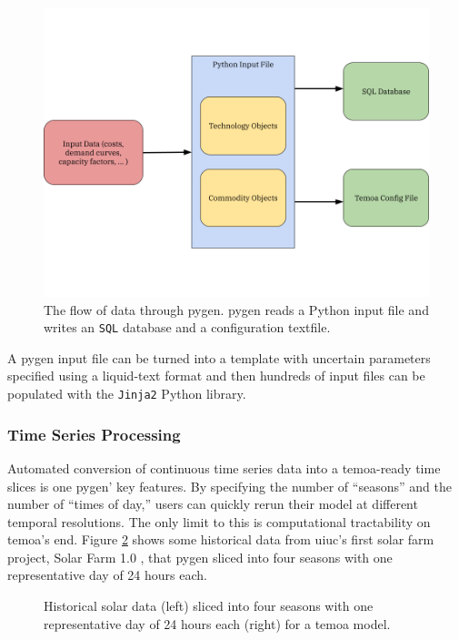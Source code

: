 \begin{figure}[H]
  \centering
  \includegraphics[width=0.8\columnwidth]{figures/pygen-outline.png}
  \caption{The flow of data through \gls{pygen}. \gls{pygen} reads a Python
  input file and writes an \texttt{SQL} database and a configuration textfile.}
  \label{fig:pygen-flow}
\end{figure}
A \gls{pygen} input file can be turned into a template with uncertain parameters
specified using a liquid-text format and then hundreds of input files can be
populated with the \texttt{Jinja2} Python library.

\subsubsection{Time Series Processing}
Automated conversion of continuous time series data into a \gls{temoa}-ready
time slices is one \gls{pygen}' key features. By specifying the number of ``seasons''
and the number of ``times of day,'' users can quickly rerun their model at different
temporal resolutions. The only limit to this is computational tractability on \gls{temoa}'s
end. Figure \ref{fig:solar-timeslice} shows some historical data from \gls{uiuc}'s
first solar farm project, Solar Farm 1.0 \cite{white_solar_2017}, that \gls{pygen}
sliced into four seasons with one representative day of 24 hours each.
\begin{figure}[H]
  \resizebox{\textwidth}{!}{}
  \caption{Historical solar data (left) sliced into four seasons with one
  representative day of 24 hours each (right) for a \gls{temoa} model.}
  \label{fig:solar-timeslice}
\end{figure}
